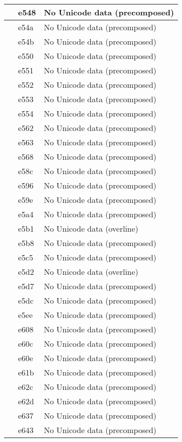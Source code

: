 \documentclass[12pt,letterpaper,openany]{book}
\begin{document}
\begin{center}
\begin{supertabular}{|m{0.25in}|m{0.5in}|m{4in}|}
 & e548 & No Unicode data (precomposed)\\\hline
 & e54a & No Unicode data (precomposed)\\\hline
 & e54b & No Unicode data (precomposed)\\\hline
 & e550 & No Unicode data (precomposed)\\\hline
 & e551 & No Unicode data (precomposed)\\\hline
 & e552 & No Unicode data (precomposed)\\\hline
 & e553 & No Unicode data (precomposed)\\\hline
 & e554 & No Unicode data (precomposed)\\\hline
 & e562 & No Unicode data (precomposed)\\\hline
 & e563 & No Unicode data (precomposed)\\\hline
 & e568 & No Unicode data (precomposed)\\\hline
 & e58c & No Unicode data (precomposed)\\\hline
 & e596 & No Unicode data (precomposed)\\\hline
 & e59e & No Unicode data (precomposed)\\\hline
 & e5a4 & No Unicode data (precomposed)\\\hline
 & e5b1 & No Unicode data (overline)\\\hline
 & e5b8 & No Unicode data (precomposed)\\\hline
 & e5c5 & No Unicode data (precomposed)\\\hline
 & e5d2 & No Unicode data (overline)\\\hline
 & e5d7 & No Unicode data (precomposed)\\\hline
 & e5dc & No Unicode data (precomposed)\\\hline
 & e5ee & No Unicode data (precomposed)\\\hline
 & e608 & No Unicode data (precomposed)\\\hline
 & e60c & No Unicode data (precomposed)\\\hline
 & e60e & No Unicode data (precomposed)\\\hline
 & e61b & No Unicode data (precomposed)\\\hline
 & e62c & No Unicode data (precomposed)\\\hline
 & e62d & No Unicode data (precomposed)\\\hline
 & e637 & No Unicode data (precomposed)\\\hline
 & e643 & No Unicode data (precomposed)\\\hline

\end{supertabular}
\end{center}
\end{document}
